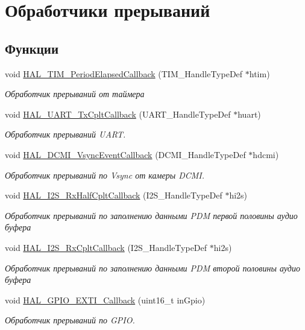 \hypertarget{group___callback}{}\section{Обработчики прерываний}
\label{group___callback}
\subsection*{Функции}
\begin{DoxyCompactItemize}
\item 
void \hyperlink{group___callback_ga8a3b0ad512a6e6c6157440b68d395eac}{H\+A\+L\+\_\+\+T\+I\+M\+\_\+\+Period\+Elapsed\+Callback} (T\+I\+M\+\_\+\+Handle\+Type\+Def $\ast$htim)
\begin{DoxyCompactList}\small\item\em Обработчик прерываний от таймера \end{DoxyCompactList}\item 
void \hyperlink{group___callback_gabcdf9b59049eccbc87d54042f9235b1a}{H\+A\+L\+\_\+\+U\+A\+R\+T\+\_\+\+Tx\+Cplt\+Callback} (U\+A\+R\+T\+\_\+\+Handle\+Type\+Def $\ast$huart)
\begin{DoxyCompactList}\small\item\em Обработчик прерываний U\+A\+RT. \end{DoxyCompactList}\item 
void \hyperlink{group___callback_ga7175c4e8555aa828b9c92cb813c3416a}{H\+A\+L\+\_\+\+D\+C\+M\+I\+\_\+\+Vsync\+Event\+Callback} (D\+C\+M\+I\+\_\+\+Handle\+Type\+Def $\ast$hdcmi)
\begin{DoxyCompactList}\small\item\em Обработчик прерываний по Vsync от камеры D\+C\+MI. \end{DoxyCompactList}\item 
void \hyperlink{group___callback_ga6c4cd3b18c42c6de0c3f4fe7068a5b12}{H\+A\+L\+\_\+\+I2\+S\+\_\+\+Rx\+Half\+Cplt\+Callback} (I2\+S\+\_\+\+Handle\+Type\+Def $\ast$hi2s)
\begin{DoxyCompactList}\small\item\em Обработчик прерываний по заполнению данными P\+DM первой половины аудио буфера \end{DoxyCompactList}\item 
void \hyperlink{group___callback_ga18c33b2d429b06674ec30e5b2b81862c}{H\+A\+L\+\_\+\+I2\+S\+\_\+\+Rx\+Cplt\+Callback} (I2\+S\+\_\+\+Handle\+Type\+Def $\ast$hi2s)
\begin{DoxyCompactList}\small\item\em Обработчик прерываний по заполнению данными P\+DM второй половины аудио буфера \end{DoxyCompactList}\item 
void \hyperlink{group___callback_gaf1bc056b786d14a72432705a45dc99f5}{H\+A\+L\+\_\+\+G\+P\+I\+O\+\_\+\+E\+X\+T\+I\+\_\+\+Callback} (uint16\+\_\+t in\+Gpio)
\begin{DoxyCompactList}\small\item\em Обработчик прерываний по G\+P\+IO. \end{DoxyCompactList}\end{DoxyCompactItemize}


